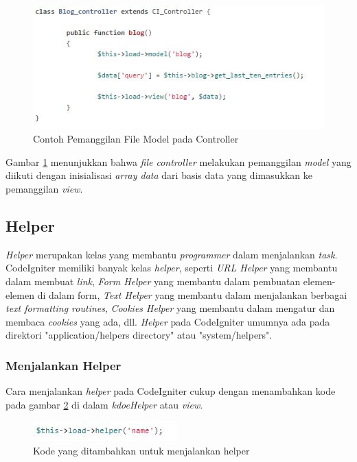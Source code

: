 		\begin{figure}[H]
			\centering
			\includegraphics[scale=1]{Gambar/model}
			\caption{Contoh Pemanggilan File Model pada Controller}
			\label{fig:controllermodel}
		\end{figure}
		
		Gambar \ref{fig:controllermodel} menunjukkan bahwa \textit{file controller} melakukan pemanggilan \textit{model} yang diikuti dengan inisialisasi \textit{array data} dari basis data yang dimasukkan ke pemanggilan \textit{view}.
		
		\subsection{Helper}
		\label{sub: helper}
		
		\textit{Helper} merupakan kelas yang membantu \textit{programmer} dalam menjalankan \textit{task}. CodeIgniter memiliki banyak kelas \textit{helper}, seperti \textit{URL Helper} yang membantu dalam membuat \textit{link}, \textit{Form Helper} yang membantu dalam pembuatan elemen-elemen di dalam form, \textit{Text Helper} yang membantu dalam menjalankan berbagai \textit{text formatting routines}, \textit{Cookies Helper} yang membantu dalam mengatur dan membaca \textit{cookies} yang ada, dll. \textit{Helper} pada CodeIgniter umumnya ada pada direktori "application/helpers directory" atau "system/helpers". 
		
		\subsubsection{Menjalankan Helper}
		\label{subsub: menjalnkanHelper}
		
		Cara menjalankan \textit{helper} pada CodeIgniter cukup dengan menambahkan kode pada gambar \ref{fig:kodeHelper} di dalam \textit{kdoeHelper} atau \textit{view}.
		
		\begin{figure}[H]
			\centering
			\includegraphics[scale=1]{Gambar/helperLoad}
			\caption{Kode yang ditambahkan untuk menjalankan helper}
			\label{fig:kodeHelper}
		\end{figure}
		
